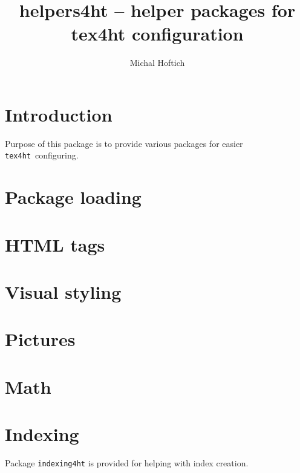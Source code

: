 \documentclass{article}
\begin{document}
 
\title{helpers4ht -- helper packages for tex4ht configuration}
\author{Michal Hoftich}
\def\texforht{\texttt{tex4ht}}
\maketitle

\tableofcontents
\section{Introduction}

Purpose of this package is to provide various packages for easier 
\texforht\ configuring. 

\section{Package loading}
\section{HTML tags}
\section{Visual styling}
\section{Pictures}
\section{Math}
\section{Indexing}

Package \texttt{indexing4ht} is provided for helping with index creation. 
\end{document}

